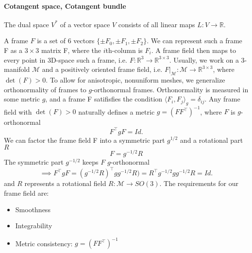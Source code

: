 \documentclass[../thesis.tex]{subfiles}
\begin{document}
\paragraph{Cotangent space, Cotangent bundle} The dual space $V^*$ of a vector space $V$
consists of all linear maps $L: V \to \mathbb{R}$.



\newpage
A frame $F$ is a set of 6 vectors $\{\pm F_0, \pm F_1, \pm F_2 \}$.
We can represent such a frame F as a $3\times3$ matrix F, where the $i$th-column is $F_i$.
A frame field then maps to every point in 3D-space such a frame, i.e. $F: \mathbb{R}^3 \to \mathbb{R}^{3\times3}$.
Usually, we work on a 3-manifold $\mathcal{M}$ and a positively oriented frame field, i.e.
$F\vert_{\mathcal{M}}: \mathcal{M} \to \mathbb{R}^{3\times3}$, where $\det(F)>0$.
To allow for anisotropic, nonuniform meshes, we generalize orthonormality of frames to
$g$-orthonormal frames. Orthonormality is measured in some metric $g$, and a frame F satifisfies the condition
$\langle F_i, F_j \rangle _g = \delta_{ij}$.
Any frame field with $\det(F)>0$ naturally defines a metric $g= (FF^{\top})^{-1}$, where $F$ is $g$-orthonormal
$$F^{\top}gF = Id.$$
We can factor the frame field F into a symmetric part $g^{1/2}$ and a rotational part $R$
$$F = g^{-1/2}R$$
The symmetric part $g^{-1/2}$ keeps $F$ $g$-orthonormal
$$ \implies F^{\top}gF = (g^{-1/2}R)^{\top}gg^{-1/2}R)=R^{\top}g^{-1/2}gg^{-1/2}R =Id.$$
and $R$ represents a rotational field $R: \mathcal{M} \to SO(3)$.
The requirements for our frame field are:
\begin{itemize}
  \item Smoothness
  \item Integrability
  \item Metric consistency: $g = (FF^{\top})^{-1}$
\end{itemize}
\end{document}

